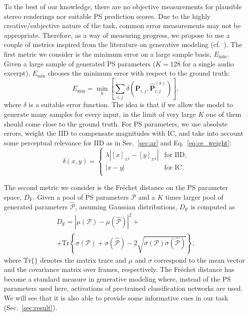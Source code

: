\documentclass{article}
\newcommand{\ma}[1]{\textbf{#1}}
\newcommand{\te}[1]{\bm{\mathcal{#1}}}
\begin{document}
To the best of our knowledge, there are no objective measurements for plausible stereo renderings nor suitable PS prediction scores. Due to the highly creative/subjective nature of the task, common error measurements may not be appropriate. Therefore, as a way of measuring progress, we propose to use a couple of metrics inspired from the literature on generative modeling (cf.~\cite{Tomczak_2022}). The first metric we consider is the minimum error on a large sample basis, $E_{\min}$. Given a large sample of generated PS parameters ($K=128$ for a single audio excerpt), $E_{\min}$ chooses the minimum error with respect to the ground truth:
\begin{equation*}
    E_{\min} = \min_k \left[ \sum_{i,j} \delta\left( \ma{P}_{i,j},\hat{\ma{P}}_{i,j}^{(k)} \right) \right] ,
\end{equation*}
where $\delta$ is a suitable error function. The idea is that if we allow the model to generate many samples for every input, in the limit of very large $K$ one of them should come close to the ground truth. For PS parameters, we use absolute errors, weight the IID to compensate magnitudes with IC, and take into account some perceptual relevance for IID as in Sec.~\ref{sec:ar} and Eq.~\ref{eq:ce_weight}:
\begin{equation*}
    \delta(x,y) = \begin{cases}
        \lambda\left| [x]_{\pm\epsilon} - [y]_{\pm\epsilon} \right| & \text{for IID}, \\
        \left| x-y  \right| & \text{for IC}. \\
    \end{cases}
\end{equation*}

The second metric we consider is the Fr\'echet distance on the PS parameter space, $D_{\text{F}}$. Given a pool of PS parameters $\te{P}$ and a $K$ times larger pool of generated parameters $\hat{\te{P}}$, assuming Gaussian distributions, $D_{\text{F}}$ is computed as
\begin{multline*}
    D_{\text{F}} = \left| \mu(\te{P}) - \mu(\hat{\te{P}}) \right|^2 + \\ + \text{Tr}\left\{ \sigma(\te{P}) + \sigma(\hat{\te{P}}) - 2\sqrt{\sigma(\te{P})\sigma(\hat{\te{P}})}  \right\},
\end{multline*}
where $\text{Tr}\{\}$ denotes the matrix trace and $\mu$ and $\sigma$ correspond to the mean vector and the covariance matrix over frames, respectively. The Fr\'echet distance has become a standard measure in generative modeling where, instead of the PS parameters used here, activations of pre-trained classification networks are used. We will see that it is also able to provide some informative cues in our task (Sec.~\ref{sec:result}).
\end{document}
